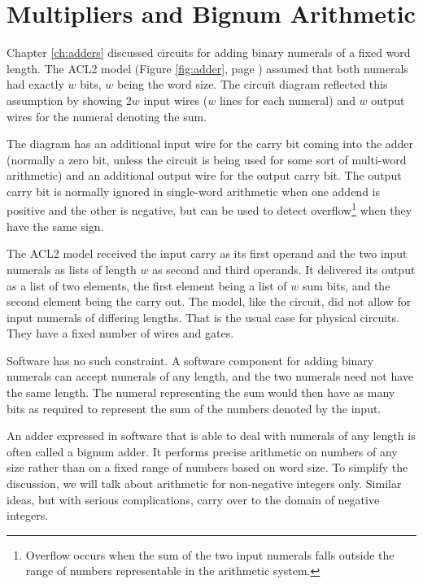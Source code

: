 \chapter{Multipliers and Bignum Arithmetic}
\label{ch:multipliers}


Chapter \ref{ch:adders} discussed circuits for adding binary numerals of a
fixed word length.
The ACL2 model (Figure \ref{fig:adder}, page \pageref{fig:adder})
assumed that both numerals had exactly $w$ bits, $w$ being the word size.
The circuit diagram reflected this assumption by
showing $2w$ input wires ($w$ lines for each numeral) and
$w$ output wires for the numeral denoting the sum.

The diagram has an additional input wire for the carry bit
coming into the adder (normally a zero bit, unless the circuit is being
used for some sort of multi-word arithmetic) and an additional output wire
for the output carry bit.
The output carry bit is normally ignored in single-word arithmetic
when one addend is positive and the other is negative,
but can be used to detect overflow\footnote{Overflow occurs
when the sum of the two input numerals falls outside
the range of numbers representable in the arithmetic system.}
when they have the same sign.

The ACL2 model received the input carry as its first operand
and the two input numerals as lists of length $w$ as second and third operands.
It delivered its output as a list of two elements,
the first element being a list of $w$ sum bits,
and the second element being the carry out.
The model, like the circuit, did not allow for input numerals
of differing lengths.
That is the usual case for physical circuits.
They have a fixed number of wires and gates.

Software has no such constraint.
A software component for adding binary numerals can accept
numerals of any length, and the two numerals need not have the same length.
The numeral representing the sum would then have as many bits as
required to represent the sum of the numbers
denoted by the input.

An adder expressed in software that is able to deal with numerals
of
any length is often called a bignum adder.
It performs precise arithmetic on numbers of any size
rather than on a fixed range of numbers based on word size.
To simplify the discussion, we will talk about arithmetic
for non-negative integers only. Similar ideas, but
with serious complications, carry over
to the domain of negative integers.

